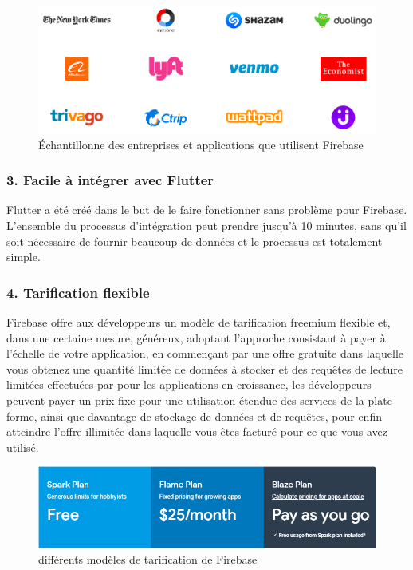 \begin{figure}[h]
	\begin{center}
		\includegraphics[width=13cm]{Images/chapter2/trusting_apps.png}
		\caption{{\footnotesize Échantillonne des entreprises et applications que utilisent Firebase}}
	\end{center}
\end{figure}

\subsubsection{3. Facile à intégrer avec Flutter}
Flutter a été créé dans le but de le faire fonctionner sans problème pour Firebase. L'ensemble du processus d'intégration peut prendre jusqu'à 10 minutes, sans qu'il soit nécessaire de fournir beaucoup de données et le processus est totalement simple.\cite{noauthor_using_nodate}

\subsubsection{4. Tarification flexible}
Firebase offre aux développeurs un modèle de tarification \gls{freemium} flexible et, dans une certaine mesure, généreux, adoptant l’approche consistant à payer à l’échelle de votre application, en commençant par une offre gratuite dans laquelle vous obtenez une quantité limitée de données à stocker et des requêtes de lecture limitées effectuées par pour les applications en croissance, les développeurs peuvent payer un prix fixe pour une utilisation étendue des services de la plate-forme, ainsi que davantage de stockage de données et de requêtes, pour enfin atteindre l'offre illimitée dans laquelle vous êtes facturé pour ce que vous avez utilisé.\cite{noauthor_firebase_nodate}\bigskip

\begin{figure}[h]
	\begin{center}
		\includegraphics[width=14cm]{Images/chapter2/firebase_pricing_offers.png}
		\caption{{\footnotesize différents modèles de tarification de Firebase}}
	\end{center}
\end{figure}
\newpage

